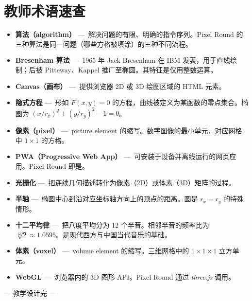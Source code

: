 \documentclass[12pt,a4paper]{scrartcl}
\newcommand{\acc}[1]{\textcolor{accent}{\textbf{#1}}}
\begin{document}
\newpage
\section{教师术语速查}\label{ap:glos}

\begin{itemize}[leftmargin=1.4em,itemsep=0.3em,topsep=0.3em]
  \item \acc{算法（algorithm）} ---\, 解决问题的有限、明确的指令序列。Pixel Round 的三种算法是同一问题（哪些方格被填涂）的三种不同流程。
  \item \acc{Bresenham 算法} ---\, 1965 年 Jack Bresenham 在 IBM 发表，用于直线绘制；后被 Pitteway、Kappel 推广至椭圆。其特征是仅用整数运算。
  \item \acc{Canvas（画布）} ---\, 提供浏览器 2D 或 3D 绘图区域的 HTML 元素。
  \item \acc{隐式方程} ---\, 形如 $F(x, y) = 0$ 的方程，曲线被定义为某函数的零点集合。椭圆为 $(x/r_x)^2 + (y/r_y)^2 - 1 = 0$。
  \item \acc{像素（pixel）} ---\, picture element 的缩写。数字图像的最小单元，对应网格中 $1 \times 1$ 的方格。
  \item \acc{PWA（Progressive Web App）} ---\, 可安装于设备并离线运行的网页应用。Pixel Round 即是。
  \item \acc{光栅化} ---\, 把连续几何描述转化为像素（2D）或体素（3D）矩阵的过程。
  \item \acc{半轴} ---\, 椭圆中心到沿对应坐标轴方向上的顶点的距离。圆是 $r_x = r_y$ 的特殊情形。
  \item \acc{十二平均律} ---\, 把八度平均分为 12 个半音。相邻半音的频率比为 $\sqrt[12]{2} \approx 1.0595$。是现代西方与中国当代音乐的基础。
  \item \acc{体素（voxel）} ---\, volume element 的缩写。三维网格中的 $1 \times 1 \times 1$ 立方单元。
  \item \acc{WebGL} ---\, 浏览器内的 3D 图形 API。Pixel Round 通过 \emph{three.js} 调用。
\end{itemize}

\vspace{2em}
\begin{center}
\color{muted}\small\sffamily
--- 教学设计完 ---
\end{center}
\end{document}
